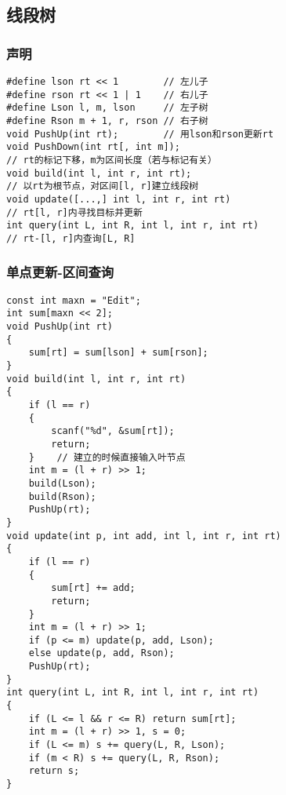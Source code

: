 \documentclass[a4]{article}
\begin{document}
\subsection{线段树}
\subsubsection{声明}
\begin{lstlisting}
#define lson rt << 1        // 左儿子
#define rson rt << 1 | 1    // 右儿子
#define Lson l, m, lson     // 左子树
#define Rson m + 1, r, rson // 右子树
void PushUp(int rt);        // 用lson和rson更新rt
void PushDown(int rt[, int m]);
// rt的标记下移，m为区间长度（若与标记有关）
void build(int l, int r, int rt);
// 以rt为根节点，对区间[l, r]建立线段树
void update([...,] int l, int r, int rt)
// rt[l, r]内寻找目标并更新
int query(int L, int R, int l, int r, int rt)
// rt-[l, r]内查询[L, R]
\end{lstlisting}
\subsubsection{单点更新-区间查询}
\begin{lstlisting}
const int maxn = "Edit";
int sum[maxn << 2];
void PushUp(int rt)
{
    sum[rt] = sum[lson] + sum[rson];
}
void build(int l, int r, int rt)
{
    if (l == r)
    {
        scanf("%d", &sum[rt]);
        return;
    }    // 建立的时候直接输入叶节点
    int m = (l + r) >> 1;
    build(Lson);
    build(Rson);
    PushUp(rt);
}
void update(int p, int add, int l, int r, int rt)
{
    if (l == r)
    {
        sum[rt] += add;
        return;
    }
    int m = (l + r) >> 1;
    if (p <= m) update(p, add, Lson);
    else update(p, add, Rson);
    PushUp(rt);
}
int query(int L, int R, int l, int r, int rt)
{
    if (L <= l && r <= R) return sum[rt];
    int m = (l + r) >> 1, s = 0;
    if (L <= m) s += query(L, R, Lson);
    if (m < R) s += query(L, R, Rson);
    return s;
}
\end{lstlisting}
\end{document}
